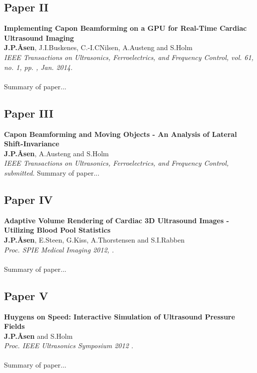 \subsection{Paper II}
\textbf{Implementing Capon Beamforming on a GPU for Real-Time Cardiac Ultrasound Imaging}\\
\textbf{J.\:P.\:\AA{}sen}, J.\:I.\:Buskenes, C.-I.\:C\:Nilsen, A.\:Austeng and S.\:Holm\\
{\it IEEE Transactions on Ultrasonics, Ferroelectrics, and Frequency Control, vol. 61, no. 1, pp. , Jan. 2014.}\\\\
Summary of paper...

\subsection{Paper III}
\textbf{Capon Beamforming and Moving Objects - An Analysis of Lateral Shift-Invariance}\\
\textbf{J.\:P.\:\AA{}sen}, A.\:Austeng and S.\:Holm\\
{\it IEEE Transactions on Ultrasonics, Ferroelectrics, and Frequency Control, submitted.}
Summary of paper...

\subsection{Paper IV}
\textbf{Adaptive Volume Rendering of Cardiac 3D Ultrasound Images - Utilizing Blood Pool Statistics}\\
\textbf{J.\:P.\:\AA{}sen}, E.\:Steen, G.\:Kiss, A.\:Thorstensen and S.\:I.\:Rabben\\
{\it Proc. SPIE Medical Imaging 2012, .}\\\\
Summary of paper...

\subsection{Paper V}
\textbf{Huygens on Speed: Interactive Simulation of Ultrasound Pressure Fields}\\
\textbf{J.\:P.\:\AA{}sen} and S.\:Holm\\
{\it Proc. IEEE Ultrasonics Symposium 2012 .}\\\\
Summary of paper...

